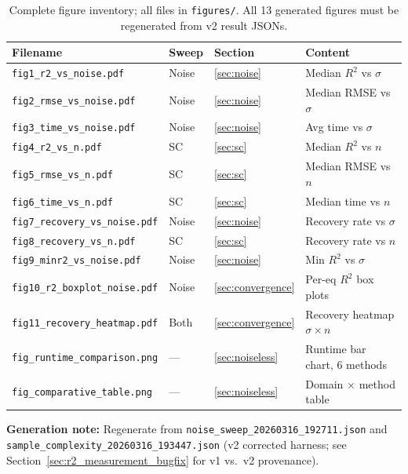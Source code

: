 \documentclass[twoside,11pt]{article}
\newcommand{\Rsq}{R^{2}}
\begin{document}
\begin{table}[H]
\centering
\caption{Complete figure inventory; all files in \texttt{figures/}.
  All 13 generated figures must be regenerated from v2 result JSONs.}
\label{tab:figlist}
\small
\renewcommand{\arraystretch}{1.25}
\begin{tabular}{L{4.8cm} L{1.5cm} L{1.8cm} L{3.2cm}}
\toprule
\textbf{Filename} & \textbf{Sweep} & \textbf{Section} & \textbf{Content}\\
\midrule
\texttt{fig1\_r2\_vs\_noise.pdf}       & Noise & \ref{sec:noise}        & Median $\Rsq$ vs $\sigma$\\
\texttt{fig2\_rmse\_vs\_noise.pdf}     & Noise & \ref{sec:noise}        & Median RMSE vs $\sigma$\\
\texttt{fig3\_time\_vs\_noise.pdf}     & Noise & \ref{sec:noise}        & Avg time vs $\sigma$\\
\texttt{fig4\_r2\_vs\_n.pdf}           & SC    & \ref{sec:sc}           & Median $\Rsq$ vs $n$\\
\texttt{fig5\_rmse\_vs\_n.pdf}         & SC    & \ref{sec:sc}           & Median RMSE vs $n$\\
\texttt{fig6\_time\_vs\_n.pdf}         & SC    & \ref{sec:sc}           & Median time vs $n$\\
\texttt{fig7\_recovery\_vs\_noise.pdf} & Noise & \ref{sec:noise}        & Recovery rate vs $\sigma$\\
\texttt{fig8\_recovery\_vs\_n.pdf}     & SC    & \ref{sec:sc}           & Recovery rate vs $n$\\
\texttt{fig9\_minr2\_vs\_noise.pdf}    & Noise & \ref{sec:noise}        & Min $\Rsq$ vs $\sigma$\\
\texttt{fig10\_r2\_boxplot\_noise.pdf} & Noise & \ref{sec:convergence}  & Per-eq $\Rsq$ box plots\\
\texttt{fig11\_recovery\_heatmap.pdf}  & Both  & \ref{sec:convergence}  & Recovery heatmap $\sigma \times n$\\
\midrule
\texttt{fig\_runtime\_comparison.png}  & ---   & \ref{sec:noiseless}    & Runtime bar chart, 6 methods\\
\texttt{fig\_comparative\_table.png}   & ---   & \ref{sec:noiseless}    & Domain $\times$ method table\\
\bottomrule
\end{tabular}
\end{table}

\noindent\textbf{Generation note:} Regenerate from
\texttt{noise\_sweep\_20260316\_192711.json} and
\texttt{sample\_complexity\_20260316\_193447.json} (v2 corrected
harness; see Section~\ref{sec:r2_measurement_bugfix} for v1 vs.\ v2 provenance).
\end{document}
